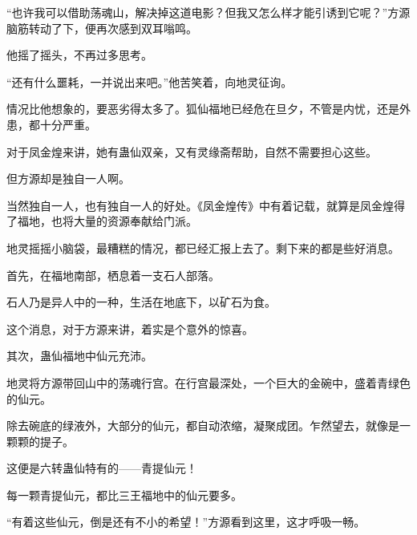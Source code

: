 \begin{this_body}
“也许我可以借助荡魂山，解决掉这道电影？但我又怎么样才能引诱到它呢？”方源脑筋转动了下，便再次感到双耳嗡鸣。

他摇了摇头，不再过多思考。

“还有什么噩耗，一并说出来吧。”他苦笑着，向地灵征询。

情况比他想象的，要恶劣得太多了。狐仙福地已经危在旦夕，不管是内忧，还是外患，都十分严重。

对于凤金煌来讲，她有蛊仙双亲，又有灵缘斋帮助，自然不需要担心这些。

但方源却是独自一人啊。

当然独自一人，也有独自一人的好处。《凤金煌传》中有着记载，就算是凤金煌得了福地，也将大量的资源奉献给门派。

地灵摇摇小脑袋，最糟糕的情况，都已经汇报上去了。剩下来的都是些好消息。

首先，在福地南部，栖息着一支石人部落。

石人乃是异人中的一种，生活在地底下，以矿石为食。

这个消息，对于方源来讲，着实是个意外的惊喜。

其次，蛊仙福地中仙元充沛。

地灵将方源带回山中的荡魂行宫。在行宫最深处，一个巨大的金碗中，盛着青绿色的仙元。

除去碗底的绿液外，大部分的仙元，都自动浓缩，凝聚成团。乍然望去，就像是一颗颗的提子。

这便是六转蛊仙特有的——青提仙元！

每一颗青提仙元，都比三王福地中的仙元要多。

“有着这些仙元，倒是还有不小的希望！”方源看到这里，这才呼吸一畅。

\end{this_body}

